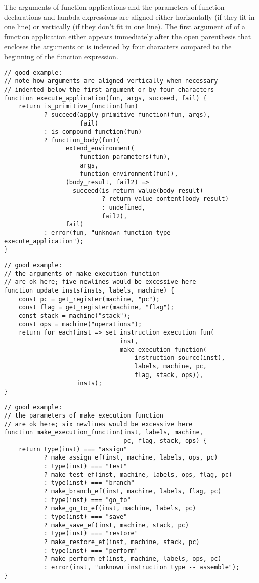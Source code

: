 The arguments of function applications and the parameters of function declarations
and lambda expressions are aligned either horizontally (if they fit in one line) or vertically
(if they don't fit in one line). The first argument of of a function application either
appears immediately after the open parenthesis that encloses the arguments or is
indented by four characters compared to the beginning of the function expression.
\begin{lstlisting}
// good example:
// note how arguments are aligned vertically when necessary
// indented below the first argument or by four characters
function execute_application(fun, args, succeed, fail) {
    return is_primitive_function(fun)
           ? succeed(apply_primitive_function(fun, args),
                     fail)
           : is_compound_function(fun) 
           ? function_body(fun)(
                 extend_environment(
                     function_parameters(fun),
                     args,
                     function_environment(fun)),
                 (body_result, fail2) => 
                   succeed(is_return_value(body_result) 
                           ? return_value_content(body_result)
                           : undefined,
                           fail2),
                 fail)
           : error(fun, "unknown function type -- execute_application");
}
\end{lstlisting}
\newpage
\begin{lstlisting}
// good example:
// the arguments of make_execution_function
// are ok here; five newlines would be excessive here
function update_insts(insts, labels, machine) {
    const pc = get_register(machine, "pc");
    const flag = get_register(machine, "flag");
    const stack = machine("stack");
    const ops = machine("operations");
    return for_each(inst => set_instruction_execution_fun(
                                inst,
                                make_execution_function(
                                    instruction_source(inst),
                                    labels, machine, pc,
                                    flag, stack, ops)),
                    insts);
}
\end{lstlisting}

\begin{lstlisting}
// good example:
// the parameters of make_execution_function 
// are ok here; six newlines would be excessive here
function make_execution_function(inst, labels, machine, 
                                 pc, flag, stack, ops) {
    return type(inst) === "assign"
           ? make_assign_ef(inst, machine, labels, ops, pc)
           : type(inst) === "test"
           ? make_test_ef(inst, machine, labels, ops, flag, pc)
           : type(inst) === "branch"
           ? make_branch_ef(inst, machine, labels, flag, pc)
           : type(inst) === "go_to"
           ? make_go_to_ef(inst, machine, labels, pc)
           : type(inst) === "save"
           ? make_save_ef(inst, machine, stack, pc)
           : type(inst) === "restore"
           ? make_restore_ef(inst, machine, stack, pc)
           : type(inst) === "perform"
           ? make_perform_ef(inst, machine, labels, ops, pc)
           : error(inst, "unknown instruction type -- assemble");
}
\end{lstlisting}

